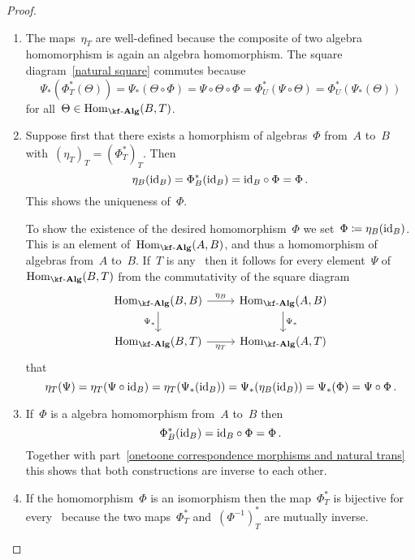 \begin{proof}
  \leavevmode
  \begin{enumerate}
    \item
      The maps~$\eta_T$ are well-defined because the composite of two algebra homomorphism is again an algebra homomorphism.
      The square diagram~\eqref{natural square} commutes because
      \[
        \Psi_*( \Phi^*_T( \Theta ) )
        =
        \Psi_* (\Theta \circ \Phi)
        =
        \Psi \circ \Theta \circ \Phi
        =
        \Phi^*_U(\Psi \circ \Theta)
        =
        \Phi^*_U(\Psi_*(\Theta))
      \]
      for all~$\Theta \in \Hom_{\cAlg{\kf}}(B,T)$.
    \item
      Suppose first that there exists a homorphism of algebras~$\Phi$ from~$A$ to~$B$ with~$(\eta_T)_T = (\Phi^*_T)_T$.
      Then
      \[
        \eta_B(\mathrm{id}_B)
        =
        \Phi^*_B(\mathrm{id}_B)
        =
        \mathrm{id}_B \circ \Phi
        =
        \Phi \,.
      \]
      This shows the uniqueness of~$\Phi$.

      To show the existence of the desired homomorphism~$\Phi$ we set~$\Phi \coloneqq \eta_B(\mathrm{id}_B)$.
      This is an element of~$\Hom_{\cAlg{\kf}}(A,B)$, and thus a homomorphism of algebras from~$A$ to~$B$.
      If~$T$ is any~{\algebra{$\kf$}} then it follows for every element~$\Psi$ of~$\Hom_{\cAlg{\kf}}(B,T)$ from the commutativity of the square diagram
      \[
        \begin{tikzcd}
          \Hom_{\cAlg{\kf}}(B,B)
          \arrow{r}[above]{\eta_B}
          \arrow{d}[left]{\Psi_*}
          &
          \Hom_{\cAlg{\kf}}(A,B)
          \arrow{d}[right]{\Psi_*}
          \\
          \Hom_{\cAlg{\kf}}(B,T)
          \arrow{r}[below]{\eta_T}
          &
          \Hom_{\cAlg{\kf}}(A,T)
        \end{tikzcd}
      \]
      that
      \[
        \eta_T(\Psi)
        =
        \eta_T(\Psi \circ \mathrm{id}_B)
        =
        \eta_T(\Psi_*(\mathrm{id}_B))
        =
        \Psi_*(\eta_B(\mathrm{id}_B))
        =
        \Psi_*(\Phi)
        =
        \Psi \circ \Phi \,.
      \]
    \item
      If~$\Phi$ is a algebra homomorphism from~$A$ to~$B$ then
      \[
        \Phi^*_B(\mathrm{id}_B)
        =
        \mathrm{id}_B \circ \Phi
        =
        \Phi \,.
      \]
      Together with part~\ref*{onetoone correspondence morphisms and natural trans} this shows that both constructions are inverse to each other.
    \item
      If the homomorphism~$\Phi$ is an isomorphism then the map~$\Phi^*_T$ is bijective for every~{\algebra{$\kf$}} because the two maps~$\Phi^*_T$ and~$(\Phi^{-1})^*_T$ are mutually inverse.


\end{enumerate}
\end{proof}
